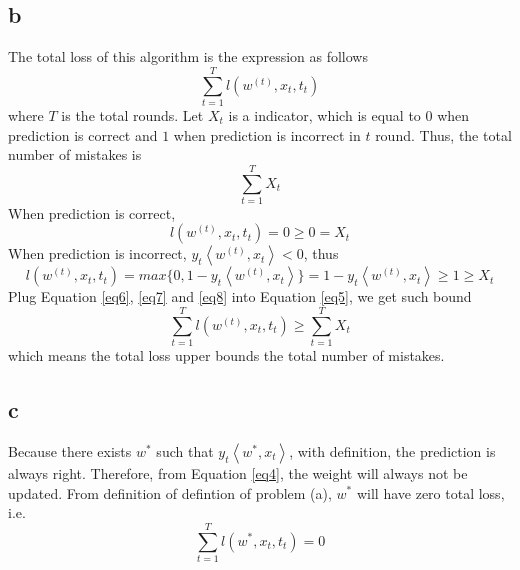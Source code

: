 \documentclass{article}
\begin{document}
	\subsection{b}
	The total loss of this algorithm is the expression as follows
	\begin{equation}
	\sum_{t=1}^{T}l(w^{(t)},x_t,t_t)
	\label{eq5}
	\end{equation}
	where $T$ is the total rounds.
	Let $X_t$ is a indicator, which is equal to $0$ when prediction is correct and $1$ when prediction is incorrect in $t$ round. Thus, the total number of mistakes is
	\begin{equation}
	\sum_{t=1}^{T}X_t
	\label{eq6}
	\end{equation}
	When prediction is correct,
	\begin{equation}
	l(w^{(t)},x_t,t_t) = 0 \geq 0 =X_t
	\label{eq7}
	\end{equation}
	When prediction is incorrect, $y_t\left<w^{(t)},x_t\right><0$, thus
	\begin{equation}
	l(w^{(t)},x_t,t_t) = max\{0,1-y_t\left<w^{(t)},x_t\right>\}=1-y_t\left<w^{(t)},x_t\right> \geq 1 \geq X_t
	\label{eq8}
	\end{equation}
	Plug Equation \ref{eq6}, \ref{eq7} and \ref{eq8} into Equation \ref{eq5}, we get such bound
	\begin{equation}
	\sum_{t=1}^{T}l(w^{(t)},x_t,t_t) \geq \sum_{t=1}^{T}X_t
	\label{eq9}
	\end{equation}
	which means the total loss upper bounds the total number of mistakes.

	\subsection{c}
	Because there exists $w^*$ such that $y_t\left<w^*,x_t\right>$, with definition, the prediction is always right. Therefore, from Equation \ref{eq4}, the weight will always not be updated. From definition of defintion of problem (a), $w^*$ will have zero total loss, i.e.
	\begin{equation}
	\sum_{t=1}^{T}l(w^*,x_t,t_t)=0
	\label{eq10}
	\end{equation}
\end{document}
